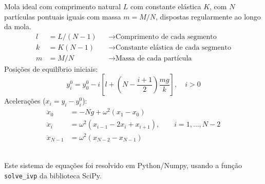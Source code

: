 \begin{minipage}{0.7\colwidth}
Mola ideal com comprimento natural $L$ com constante elástica $K$, com $N$
partículas pontuais iguais com massa $m=M/N$, dispostas regularmente ao longo da
mola.
\begin{align*}
  l&=L/(N-1)&&\rightarrow\text{Comprimento de cada segmento}\\
  k&=K(N-1)&& \rightarrow\text{Constante elástica de cada segmento}\\
  m&=M/N    &&\rightarrow\text{Massa de cada partícula}
\end{align*}
Posições de equilíbrio iniciais:
\begin{equation*}
  y_i^0=y_0^0-i\left[l+\left(N-\frac{i+1}{2}\right)\frac{mg}{k}\right],\quad i>0
\end{equation*}
Acelerações ($x_i=y_i-y_i^0$):
  \begin{align*}
    \ddot x_0 &=-Ng+\omega^2(x_1-x_0)\\
    \ddot x_i &= \omega^2(x_{i-1}-2x_i+x_{i+1}),\qquad i=1, \ldots, N-2\\
    \ddot x_{N-1} &=\omega^2(x_{N-2}-x_{N-1})
  \end{align*}
\end{minipage}\\[1cm]
Este sistema de equações foi resolvido em Python/Numpy, usando a função
\texttt{solve\_ivp} da biblioteca SciPy.
